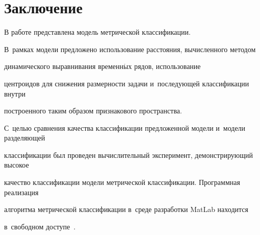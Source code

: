 \vspace*{-4pt}



\section*{Заключение}



\vspace*{-2pt}



В работе представлена модель метрической классификации. 

В~рамках модели предложено использование расстояния, вычисленного методом 

динамического выравнивания временн$\acute{\mbox{ы}}$х рядов, использование 

центроидов для снижения размерности задачи и~последующей классификации внутри 

построенного таким образом признакового пространства. 

С~целью сравнения качества классификации предложенной модели и~модели разделяющей 

классификации был проведен вычислительный эксперимент, демонстрирующий высокое 

качество классификации модели метрической классификации. Программная реализация 

алгоритма метрической классификации в~среде разработки MatLab находится 

в~свободном доступе~\cite{StrategyCode}.





